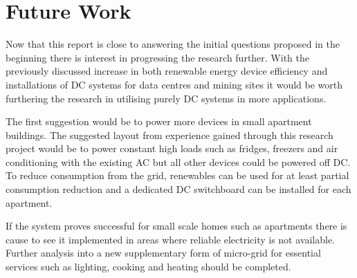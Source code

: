 \section{Future Work}

Now that this report is close to answering the initial questions proposed in the beginning there is interest in progressing the research further. With the previously discussed increase in both renewable energy device efficiency and installations of DC systems for data centres and mining sites it would be worth furthering the research in utilising purely DC systems in more applications. 
\newline

The first suggestion would be to power more devices in small apartment buildings. The suggested layout from experience gained through this research project would be to power constant high loads such as fridges, freezers and air conditioning with the existing AC but all other devices could be powered off DC. To reduce consumption from the grid, renewables can be used for at least partial consumption reduction and a dedicated DC switchboard can be installed for each apartment. 
\newline

If the system proves successful for small scale homes such as apartments there is cause to see it implemented in areas where reliable electricity is not available. Further analysis into a new supplementary form of micro-grid for essential services such as lighting, cooking and heating should be completed. 

\newpage